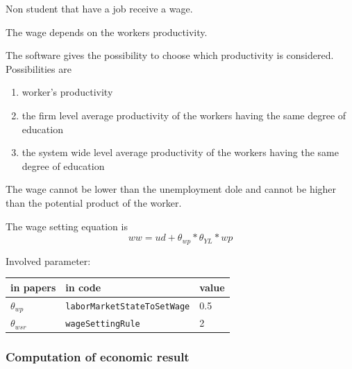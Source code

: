 \documentclass{article}
\begin{document}
Non student that have a job receive a wage. 

The wage depends on the workers productivity. 

The software gives the possibility to choose which productivity is considered. Possibilities are
\begin{enumerate}
	\item worker's productivity
		\item the firm level average productivity of the workers having the same degree of education
		\item the system wide level average productivity of the workers having the same degree of education
\end{enumerate}

The wage cannot be lower than the unemployment dole and cannot be higher than the potential product of the worker.

The wage setting equation is
\[
	ww=ud+\theta_{wp}*\theta_{YL}*wp
\]

Involved parameter:

\begin{tabular}{l l l}
	\hline
	in papers& in code&value\\
	\hline
	\hline
$\theta_{wp}$&\verb+laborMarketStateToSetWage+&0.5\\
$\theta_{wsr}$&\verb+wageSettingRule+&2\\
	\hline

\end{tabular}


\subsubsection{Computation of economic result}
\end{document}
